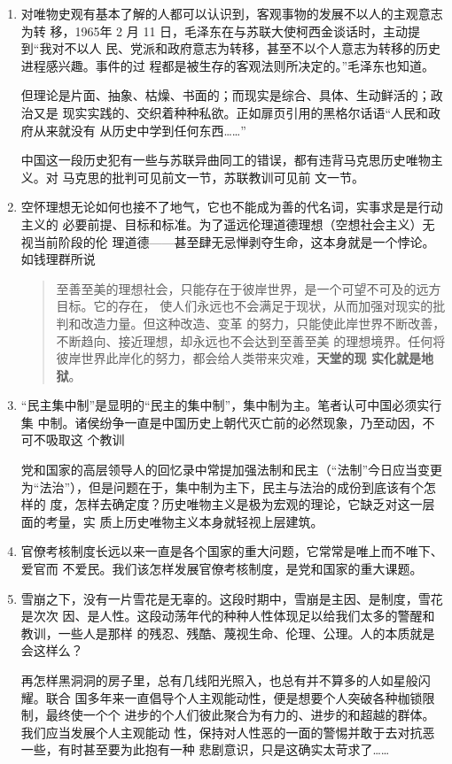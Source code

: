 \begin{enumerate}
\item 对唯物史观有基本了解的人都可以认识到，客观事物的发展不以人的主观意志为转
  移，1965年 2 月 11 日，毛泽东在与苏联大使柯西金谈话时，主动提到“我对不以人
  民、党派和政府意志为转移，甚至不以个人意志为转移的历史进程感兴趣。事件的过
  程都是被生存的客观法则所决定的。”毛泽东也知道。

  但理论是片面、抽象、枯燥、书面的；而现实是综合、具体、生动鲜活的；政治又是
  现实实践的、交织着种种私欲。正如扉页引用的黑格尔话语“人民和政府从来就没有
  从历史中学到任何东西……”

  中国这一段历史犯有一些与苏联异曲同工的错误，都有违背马克思历史唯物主义。对
  马克思的批判可见前文一节，苏联教训可见前
  文一节。

\item 空怀理想无论如何也接不了地气，它也不能成为善的代名词，实事求是是行动主义的
  必要前提、目标和标准。为了遥远伦理道德理想（空想社会主义）无视当前阶段的伦
  理道德——甚至肆无忌惮剥夺生命，这本身就是一个悖论。如钱理群所说
  \begin{quotation}
    至善至美的理想社会，只能存在于彼岸世界，是一个可望不可及的远方目标。它的存在，
    使人们永远也不会满足于现状，从而加强对现实的批判和改造力量。但这种改造、变革
    的努力，只能使此岸世界不断改善，不断趋向、接近理想，却永远也不会达到至善至美
    的理想境界。任何将彼岸世界此岸化的努力，都会给人类带来灾难，\textbf{天堂的现
      实化就是地狱}。
  \end{quotation}

\item “民主集中制”是显明的“民主的集中制”，集中制为主。笔者认可中国必须实行集
  中制。诸侯纷争一直是中国历史上朝代灭亡前的必然现象，乃至动因，不可不吸取这
  个教训

  党和国家的高层领导人的回忆录中常提加强法制和民主（“法制”今日应当变更
  为“法治”），但是问题在于，集中制为主下，民主与法治的成份到底该有个怎样的
  度，怎样去确定度？历史唯物主义是极为宏观的理论，它缺乏对这一层面的考量，实
  质上历史唯物主义本身就轻视上层建筑。

\item 官僚考核制度长远以来一直是各个国家的重大问题，它常常是唯上而不唯下、爱官而
  不爱民。我们该怎样发展官僚考核制度，是党和国家的重大课题。

\item 雪崩之下，没有一片雪花是无辜的。这段时期中，雪崩是主因、是制度，雪花是次次
  因、是人性。这段动荡年代的种种人性体现足以给我们太多的警醒和教训，一些人是那样
  的残忍、残酷、蔑视生命、伦理、公理。人的本质就是会这样么？

  再怎样黑洞洞的房子里，总有几线阳光照入，也总有并不算多的人如星般闪耀。联合
  国多年来一直倡导个人主观能动性，便是想要个人突破各种枷锁限制，最终使一个个
  进步的个人们彼此聚合为有力的、进步的和超越的群体。我们应当发展个人主观能动
  性，保持对人性恶的一面的警惕并敢于去对抗恶一些，有时甚至要为此抱有一种
  悲剧意识，只是这确实太苛求了……
\end{enumerate}

